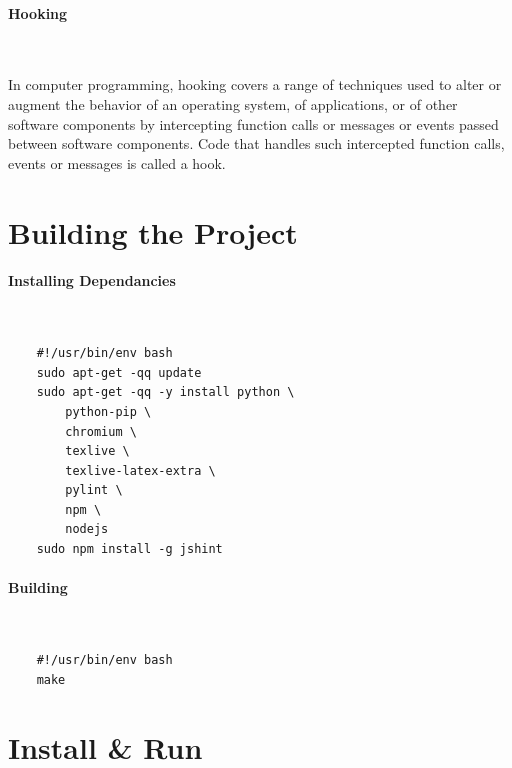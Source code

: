 \documentclass{article}
\begin{document}
\paragraph{Hooking}\mbox{}\\
\begin{tcolorbox}[title=\href{https://en.wikipedia.org/wiki/Hooking}{Wikipedia}]
  In computer programming, hooking covers a range of techniques used to alter or augment the behavior of an operating system, of applications, or of other software components by intercepting function calls or messages or events passed between software components. Code that handles such intercepted function calls, events or messages is called a hook.
\end{tcolorbox}

\pagebreak

\section{Building the Project}
\paragraph{Installing Dependancies}\mbox{}\\
\begin{tcolorbox}[title=install-deps.sh]
  \begin{verbatim}
    #!/usr/bin/env bash
    sudo apt-get -qq update
    sudo apt-get -qq -y install python \
        python-pip \
        chromium \
        texlive \
        texlive-latex-extra \
        pylint \
        npm \
        nodejs
    sudo npm install -g jshint
  \end{verbatim}
\end{tcolorbox}
\paragraph{Building}\mbox{}\\
\begin{tcolorbox}[title=build.sh]
  \begin{verbatim}
    #!/usr/bin/env bash
    make
  \end{verbatim}
\end{tcolorbox}

\section{Install \& Run}
\end{document}
